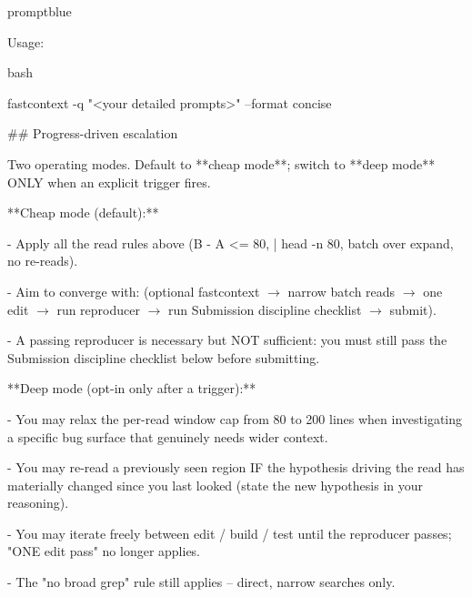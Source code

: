 \documentclass{llmxive}
\begin{document}
\begin{promptbox}{promptblue}
{\vspace{0.35em}\par
Usage:\par
\textasciigrave{}\textasciigrave{}\textasciigrave{}bash\par
fastcontext -q "\textless{}your detailed prompts\textgreater{}" --format concise\par
\textasciigrave{}\textasciigrave{}\textasciigrave{}\par
\vspace{0.35em}\par
\#\# Progress-driven escalation\par
\vspace{0.35em}\par
Two operating modes. Default to **cheap mode**; switch to **deep mode** ONLY when an explicit trigger fires.\par
\vspace{0.35em}\par
**Cheap mode (default):**\par
- Apply all the read rules above (\textasciigrave{}B - A \textless{}= 80\textasciigrave{}, \textasciigrave{}| head -n 80\textasciigrave{}, batch over expand, no re-reads).\par
- Aim to converge with: (optional fastcontext $\to$ narrow batch reads $\to$ one edit $\to$ run reproducer $\to$ run Submission discipline checklist $\to$ submit).\par
- A passing reproducer is necessary but NOT sufficient: you must still pass the Submission discipline checklist below before submitting.\par
\vspace{0.35em}\par
**Deep mode (opt-in only after a trigger):**\par
- You may relax the per-read window cap from 80 to 200 lines when investigating a specific bug surface that genuinely needs wider context.\par
- You may re-read a previously seen region IF the hypothesis driving the read has materially changed since you last looked (state the new hypothesis in your reasoning).\par
- You may iterate freely between edit / build / test until the reproducer passes; "ONE edit pass" no longer applies.\par
- The "no broad grep" rule still applies -- direct, narrow searches only.\par
\vspace{0.35em}\par
}
\end{promptbox}
\end{document}
